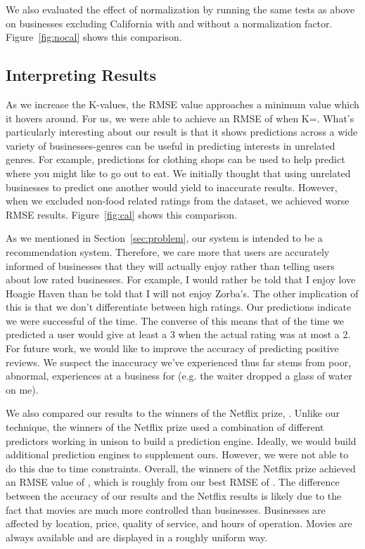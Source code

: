 We also evaluated the effect of normalization by running the same tests as
above on businesses excluding California with and without a normalization
factor. Figure~\ref{fig:nocal} shows this comparison.

\subsection{Interpreting Results}
As we increase the K-values, the RMSE value approaches a minimum value which it
hovers around. For us, we were able to achieve an RMSE of \bestRMSE when
K=\bestK.
What's particularly interesting about our result is that it shows predictions
across a wide variety of businesses-genres can be useful in predicting
interests in unrelated genres. For example, predictions for clothing shops can
be used to help predict where you might like to go out to eat. We initially
thought that using unrelated businesses to predict one another would yield to
inaccurate results. However, when we excluded non-food related ratings from the
dataset, we achieved worse RMSE results. Figure~\ref{fig:cal} shows this comparison.

As we mentioned in Section~\ref{sec:problem}, our system is intended to be a recommendation system. 
Therefore, we care more that users are accurately informed of businesses that they will actually enjoy rather than
telling users about low rated businesses. For example, I would rather be told that I enjoy love Hoagie Haven than be told
that I will not enjoy Zorba's. The other implication of this is that we don't differentiate between high ratings. Our predictions
indicate we were successful \posAccuracy of the time. The converse of this means
that \posInaccuracy of the time we predicted a user would give at least a 3 when the actual rating was at most a 2.  For future work,
we would like to improve the accuracy of predicting positive reviews. We suspect the inaccuracy we've experienced thus far stems
from poor, abnormal, experiences at a business for  (e.g. the waiter dropped a glass of water on me).

We also compared our results to the winners of the Netflix prize,
\cite{netprize}. Unlike our technique, the winners of the Netflix prize used a
combination of different predictors working in unison to build a prediction
engine. Ideally, we would build additional prediction engines to supplement
ours. However, we were not able to do this due to time constraints. Overall,
the winners of the Netflix prize achieved an RMSE value of \bestNetflixRMSEnsp,
which is roughly \netDiff from our best RMSE of \bestRMSEnsp. The difference
between the accuracy of our results and the Netflix results is likely due to
the fact that movies are much more controlled than businesses. Businesses are
affected by location, price, quality of service, and hours of operation. Movies
are always available and are displayed in a roughly uniform way. 


